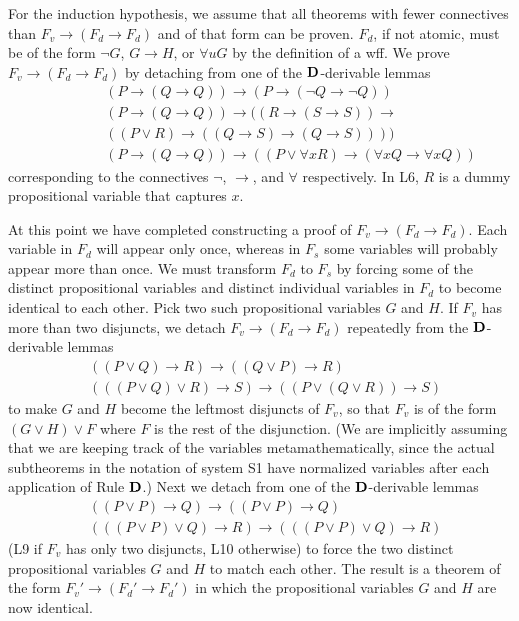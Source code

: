 \documentclass[leqno]{article}
\begin{document}
     For the induction hypothesis, we assume that all theorems with fewer
connectives than $F_v\rightarrow (F_d\rightarrow F_d)$ and of that form can
be proven.  $F_d$, if not atomic, must be of the form $\lnot G$,
$G\rightarrow H$, or $\forall uG$ by the definition of a wff.  We prove
$F_v\rightarrow (F_d\rightarrow F_d)$ by detaching from one of the
${\bf D}$-derivable lemmas
\begin{eqnarray} %
  & (P\rightarrow (Q\rightarrow Q))\rightarrow (P\rightarrow (\lnot
      Q\rightarrow \lnot Q)) \\
  & (P\rightarrow (Q\rightarrow Q))\rightarrow ((R\rightarrow
     (S\rightarrow S))\rightarrow
        \qquad\qquad\qquad
         \\
        \qquad\qquad
    & ((P\vee R)\rightarrow ((Q\rightarrow
       S)\rightarrow (Q\rightarrow S)))) \nonumber \\
  & (P\rightarrow (Q\rightarrow Q))\rightarrow ((P\vee \forall
     xR)\rightarrow (\forall xQ\rightarrow \forall xQ))
\end{eqnarray}
corresponding to the connectives $\lnot $, $\rightarrow $, and $\forall $
respectively.  In L6, $R$ is a dummy propositional variable that captures $x$.

     At this point we have completed constructing a proof of $F_v\rightarrow
(F_d\rightarrow F_d)$.  Each variable in $F_d$ will appear only once, whereas
in $F_s$ some variables will probably appear more than once.  We must
transform $F_d$ to $F_s$ by forcing some of the distinct propositional
variables and distinct individual variables in $F_d$ to become identical to
each other.  Pick two such propositional variables $G$ and $H$.  If $F_v$ has
more than two disjuncts, we detach $F_v\rightarrow (F_d\rightarrow F_d)$
repeatedly from the ${\bf D}$-derivable lemmas
\begin{eqnarray} %
  & ((P\vee Q)\rightarrow R)\rightarrow ((Q\vee P)\rightarrow R) \\
  & (((P\vee Q)\vee R)\rightarrow S)\rightarrow ((P\vee (Q\vee
      R))\rightarrow S)
\end{eqnarray}
to make $G$ and $H$ become the leftmost disjuncts of $F_v$, so that $F_v$ is
of the form $(G\vee H)\vee F$ where $F$ is the rest of the disjunction.  (We
are implicitly assuming that we are keeping track of the variables
metamathematically, since the actual subtheorems in the notation of system S1
have normalized variables after each application of Rule ${\bf D}$.)  Next we
detach from one of the ${\bf D}$-derivable lemmas
\begin{eqnarray} %
  & ((P\vee P)\rightarrow Q)\rightarrow ((P\vee P)\rightarrow Q) \\
  & (((P\vee P)\vee Q)\rightarrow R)\rightarrow (((P\vee P)\vee
      Q)\rightarrow R)
\end{eqnarray}
(L9 if $F_v$ has only two disjuncts, L10 otherwise) to force the two distinct
propositional variables $G$ and $H$ to match each other.  The result is a
theorem of the form $F_v'\rightarrow (F_d'\rightarrow F_d')$ in which the
propositional variables $G$ and $H$ are now identical.
\end{document}
